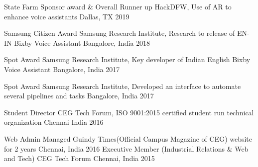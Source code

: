 



\begin{cvhonors}

  \cvhonor
    {State Farm Sponsor award \& Overall Runner up} %
    {HackDFW, Use of AR to enhance voice assistants} %
    {Dallas, TX} %
    {2019} %


  \cvhonor
    {Samsung Citizen Award} %
    {Samsung Research Institute, Research to release of EN-IN Bixby Voice Assistant} %
    {Bangalore, India} %
    {2018} %

  \cvhonor
    {Spot Award} %
    {Samsung Research Institute, Key developer of Indian English Bixby Voice Assistant} %
    {Bangalore, India} %
    {2017} %

  \cvhonor
    {Spot Award} %
    {Samsung Research Institute, Developed an interface to automate several pipelines and tasks} %
    {Bangalore, India} %
    {2017} %

  \cvhonor
    {Student Director} %
    {CEG Tech Forum, ISO 9001:2015 certified student run technical organization} %
    {Chennai India} %
    {2016} %

  \cvhonor
  {Web Admin} %
  {Managed Guindy Times(Official Campus Magazine of CEG) website for 2 years} %
  {Chennai, India} %
  {2016} %
%
  \cvhonor
    {Executive Member (Industrial Relations \& Web and Tech)} %
    {CEG Tech Forum} %
    {Chennai, India} %
    {2015} %
%
%

\end{cvhonors}
